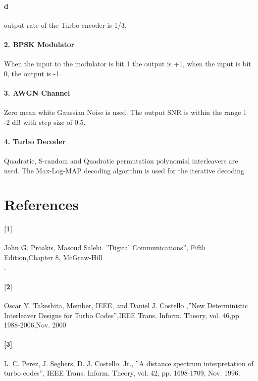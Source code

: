 \documentclass[20 pts]{article}
\begin{document}
\paragraph{d}
output rate of the Turbo encoder is 1/3.
\paragraph{2. BPSK Modulator}\paragraph{}
When the input to the modulator is bit 1 the output is +1, when the input is bit 0, the output is -1.
\paragraph{3. AWGN Channel}\paragraph{}
Zero mean white Gaussian Noise is used. The output SNR is within the range {1 -2} dB with step size of 0.5.
\paragraph{4. Turbo Decoder}\paragraph{}
Quadratic, S-random and Quadratic permutation polynomial interleavers are used. The Max-Log-MAP decoding algorithm is used for the iterative decoding

\section{References}
\paragraph{[1]}   John G. Proakis, Masoud Salehi. ''Digital Communications'', Fifth Edition,Chapter 8, McGraw-Hill\\.
\paragraph{[2]}  Oscar Y. Takeshita, Member, IEEE, and Daniel J. Costello ,''New Deterministic Interleaver Designs for Turbo Codes'',IEEE Trans. Inform. Theory, vol.  46,pp. 1988-2006,Nov. 2000\\
\paragraph{[3]}  L. C. Perez, J. Seghers, D. J. Costello, Jr., ''A distance spectrum interpretation of turbo codes'', IEEE Trans. Inform. Theory, vol. 42, pp. 1698-1709, Nov. 1996.\\
\end{document}
